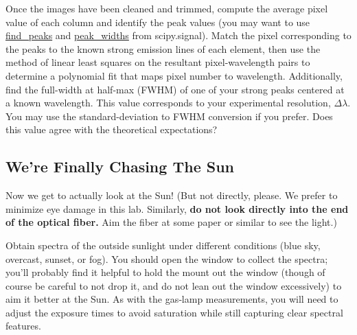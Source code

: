 \documentclass{../lab}
\begin{document}
Once the images have been cleaned and trimmed, compute the average pixel value of each column and identify the peak values (you may want to use \href{https://docs.scipy.org/doc/scipy/reference/generated/scipy.signal.find_peaks.html}{find\_peaks} and \href{https://docs.scipy.org/doc/scipy/reference/generated/scipy.signal.peak_widths.html}{peak\_widths} from scipy.signal). Match the pixel corresponding to the peaks to the known strong emission lines of each element, then use the method of linear least squares on the resultant pixel-wavelength pairs to determine a polynomial fit that maps pixel number to wavelength. Additionally, find the full-width at half-max (FWHM) of one of your strong peaks centered at a known wavelength. This value corresponds to your experimental resolution, $\Delta \lambda$. You may use the standard-deviation to FWHM conversion if you prefer. Does this value agree with the theoretical expectations? 





\subsection{We're Finally Chasing The Sun}

Now we get to actually look at the Sun! (But not directly, please. We prefer to minimize eye damage in this lab. Similarly, \textbf{do not look directly into the end of the optical fiber.} Aim the fiber at some paper or similar to see the light.)

Obtain spectra of the outside sunlight under different conditions (blue sky, overcast, sunset, or fog). You should open the window to collect the spectra; you'll probably find it helpful to hold the mount out the window (though of course be careful to not drop it, and do not lean out the window excessively) to aim it better at the Sun. As with the gas‑lamp measurements, you will need to adjust the exposure times to avoid saturation while still capturing clear spectral features.

\end{document}
